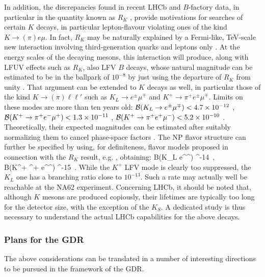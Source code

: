 In addition, the discrepancies found in recent LHCb and $B$-factory data, in particular in the quantity known as $R_K$ \cite{Aaij:2014ora}, provide motivations for searches of certain $K$ decays, in particular lepton-flavour violating  ones of the kind $K \to (\pi) e \mu$. In fact, $R_K$ may be naturally explained by a Fermi-like, TeV-scale new interaction involving third-generation quarks and leptons only \cite{Glashow:2014iga}. At the  energy scales of the decaying mesons, this interaction will produce, along with LFUV effects such as $R_K$, also LFV $B$ decays, whose natural magnitude can be estimated to be in the ballpark of $10^{-8}$ by just using the departure of $R_K$ from unity \cite{Glashow:2014iga}. That argument can be extended to $K$ decays as well, in particular those of the kind $K \to (\pi) \ell \ell'$ such as $K_L \to e^\pm \mu^\mp$ and $K^+ \to \pi^+ e^\pm \mu^\mp$. Limits on these modes are more than ten years old: $\mathcal B(K_L \rightarrow e^\pm \mu^\mp) < 4.7 \times 10^{-12}$ \cite{Ambrose:1998us}, $\mathcal B(K^+ \rightarrow \pi^+ e^- \mu^+) < 1.3 \times 10^{-11}$ \cite{Sher:2005sp}, $\mathcal B(K^+ \rightarrow \pi^+ e^+ \mu^-) < 5.2 \times 10^{-10}$ \cite{Appel:2000tc}. Theoretically, their expected magnitudes can be estimated after suitably normalizing them to cancel phase-space factors \cite{Cahn:1980kv}. The NP flavor structure can further be specified by using, for definiteness, flavor models proposed in connection with the $R_K$ result, e.g. \cite{Guadagnoli:2015nra,Boucenna:2015raa},   obtaining:
\be
\label{eq:KLemu}
\mc B(K_L \to e^\pm \mu^\mp)  ^{-14}~, \\
\mc B(K^+ \to \pi^+ e^\pm \mu^\mp)  ^{-15}~.
\ee
While the $K^+$ LFV mode is clearly too suppressed, the $K_L$ one has a branching ratio close to $10^{-13}$. Such a rate may actually well be reachable at the NA62 experiment. Concerning LHCb, it should be noted that, although $K$ mesons are produced copiously, their lifetimes are typically too long for the detector size, with the exception of the $K_S$. A dedicated study is thus necessary to understand the actual LHCb capabilities for the above decays.

\subsubsection*{Plans for the GDR}

The above considerations can be translated in a number of interesting directions to be pursued in the framework of the GDR.


